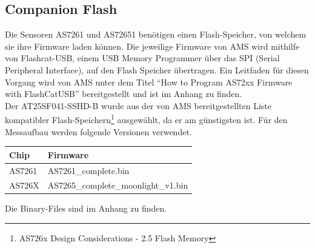\subsection{Companion Flash}
\label{sec_Companion_Flash}
Die Sensoren AS7261 und AS72651 benötigen einen Flash-Speicher, von welchem sie ihre Firmware laden können.
Die jeweilige Firmware von AMS wird mithilfe von Flashcat-USB, einem USB Memory Programmer über das SPI (Serial Peripheral Interface), auf den Flash Speicher übertragen.
Ein Leitfaden für diesen Vorgang wird von AMS unter dem Titel ``How to Program AS72xx Firmware with FlashCatUSB'' bereitgestellt und ist im Anhang zu finden.\\
Der AT25SF041-SSHD-B wurde aus der von AMS bereitgestellten Liste kompatibler Flash-Speichern\footnote{AS726x Design Considerations - 2.5 Flash Memory} ausgewählt, da er am günstigsten ist. 
Für den Messaufbau werden folgende Versionen verwendet.

\begin{tabular}{ l|l } 

  Chip  & Firmware \\ 
 \hline
 AS7261  & AS7261\_complete.bin \\ 
 
 AS726X & AS7265\_complete\_moonlight\_v1.bin\\ 

\end{tabular}
\medskip

Die Binary-Files  sind im Anhang zu finden.\\



